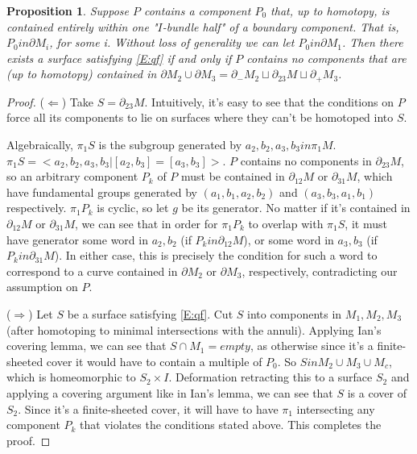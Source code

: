 \documentclass[12pt]{amsart}
\newtheorem{prop}[theorem]{Proposition}
\theoremstyle{definition}
\newcommand{\x}{\times}
\newcommand{\bd}{\partial}
\begin{document}
\begin{prop}

Suppose $P$ contains a component $P_0$ that, up to homotopy, is contained
entirely within one "$I$-bundle half" of a boundary component. That is, $P_0 in
\bd M_i$, for some i. Without loss of generality we can let $P_0 in \bd M_1$.
Then there exists a surface satisfying \eqref{E:qf} if and only if $P$ contains
no components that are (up to homotopy) contained in $\bd M_2 \cup \bd M_3
= \bd_-M_2 \sqcup \bd_{23}M \sqcup \bd_+M_3$.

\end{prop}
\begin{proof}

($\Longleftarrow$) Take $S=\bd_{23}M$. Intuitively, it's easy to see that the
conditions on $P$ force all its components to lie on surfaces where they can't
be homotoped into $S$.

Algebraically, $\pi_1S$ is the subgroup generated by $a_2,b_2,a_3,b_3 in
\pi_1M$. $\pi_1S = <a_2,b_2,a_3,b_3 | [a_2,b_3]=[a_3,b_3]>$. $P$ contains no
components in $\bd_{23}M$, so an arbitrary component $P_k$ of $P$  must be
contained in $\bd_{12}M$ or $\bd_{31}M$, which have fundamental groups
generated by $(a_1,b_1,a_2,b_2)$ and $(a_3,b_3,a_1,b_1)$ respectively.
$\pi_1P_k$ is cyclic, so let $g$ be its generator. No matter if it's contained
in $\bd_{12}M$ or $\bd_{31}M$, we can see that in order for $\pi_1P_k$ to
overlap with $\pi_1S$, it must have generator some word in $a_2,b_2$ (if $P_k
in \bd_{12}M$), or some word in $a_3,b_3$ (if $P_k in \bd_{31}M$). In either
case, this is precisely the condition for such a word to correspond to a curve
contained in $\bd M_2$ or $\bd M_3$, respectively, contradicting our assumption
on $P$.

($\Longrightarrow$) Let $S$ be a surface satisfying \eqref{E:qf}. Cut $S$ into
components in $M_1,M_2,M_3$ (after homotoping to minimal intersections with the
annuli).  Applying Ian's covering lemma, we can see that $S \cap M_1 = empty$,
as otherwise since it's a finite-sheeted cover it would have to contain
a multiple of $P_0$.  So $S in M_2 \cup M_3 \cup M_c$, which is homeomorphic to
$S_2 \x I$. Deformation retracting this to a surface $S_2$ and applying
a covering argument like in Ian's lemma, we can see that $S$ is a cover of
$S_2$. Since it's a finite-sheeted cover, it will have to have $\pi_1$
intersecting any component $P_k$ that violates the conditions stated above.
This completes the proof.

\end{proof}
\end{document}
